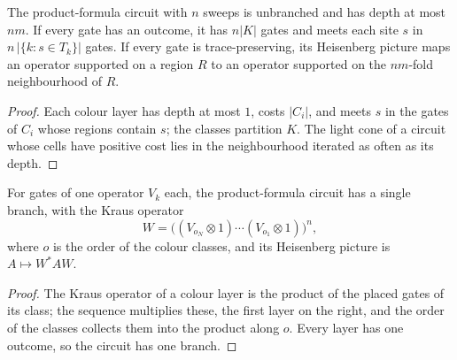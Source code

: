 \begin{theorem}
    \label{thm:circuits_product_formula_costs}
    \leanok
    The product-formula circuit with $n$ sweeps is unbranched and has depth at most
    $nm$. If every gate has an outcome, it has $n|K|$ gates and meets each site $s$
    in $n\,|\{k: s\in T_k\}|$ gates. If every gate is trace-preserving, its
    Heisenberg picture maps an operator supported on a region $R$ to an operator
    supported on the $nm$-fold neighbourhood of $R$.
\end{theorem}
\begin{proof}\leanok
    Each colour layer has depth at most $1$, costs $|C_i|$, and meets $s$ in the
    gates of $C_i$ whose regions contain $s$; the classes partition $K$. The light
    cone of a circuit whose cells have positive cost lies in the neighbourhood
    iterated as often as its depth.
\end{proof}

\begin{theorem}
    \label{thm:circuits_product_formula_single}
    \leanok
    For gates of one operator $V_k$ each, the product-formula circuit has a single
    branch, with the Kraus operator
    \[
        W=\bigl((V_{o_N}\otimes1)\cdots(V_{o_1}\otimes1)\bigr)^n,
    \]
    where $o$ is the order of the colour classes, and its Heisenberg picture is
    $A\mapsto W^*AW$.
\end{theorem}
\begin{proof}\leanok
    The Kraus operator of a colour layer is the product of the placed gates of its
    class; the sequence multiplies these, the first layer on the right, and the
    order of the classes collects them into the product along $o$. Every layer has
    one outcome, so the circuit has one branch.
\end{proof}

